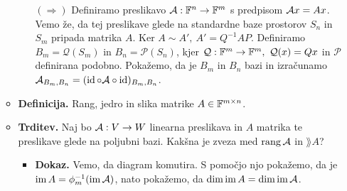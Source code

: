 \begin{enumerate}
\begin{itemize}
\begin{itemize}
            $(\Rightarrow)$ Definiramo preslikavo $\mathcal{A}: \mathbb{F}^n \to \mathbb{F}^m$ s predpisom $\mathcal{A} x = Ax$. Vemo že, da tej preslikave glede na standardne baze prostorov $S_n$ in $S_m$ pripada matrika $A$. Ker $A \sim A', \ A' = Q^{-1} A P$. Definiramo $B_m = \mathcal{Q}(S_m)$ in $B_n = \mathcal{P}(S_n)$, kjer $\mathcal{Q}: \FF^m \to \FF^m, \ \mathcal{Q}(x) = Qx$ in $\mathcal{P}$ definirana podobno. Pokažemo, da je $B_m$ in $B_n$ bazi in izračunamo $\mathcal{A}_{B_m, B_n} = (\operatorname{id} \circ \mathcal{A} \circ \operatorname{id})_{B_m, B_n}$.
        \end{itemize}
        \item \colorbox{purple!30}{\textbf{Definicija.}} Rang, jedro in slika matrike $A \in \mathbb{F}^{m \times n}$. 
        \item \colorbox{blue!30}{\textbf{Trditev.}} Naj bo $\mathcal{A}: V \to W$ linearna preslikava in $A$ matrika te preslikave glede na poljubni bazi. Kakšna je zveza med $\operatorname{rang} \mathcal{A}$ in $\rang A$?
        \begin{itemize}
            \item \colorbox{green!30}{\textbf{Dokaz.}} Vemo, da diagram     
              komutira. S pomočjo njo pokažemo, da je $\operatorname{im} A = \phi^{-1}_m(\operatorname{im} \mathcal{A})$, nato pokažemo, da $\dim \operatorname{im} A = \dim \operatorname{im} \mathcal{A}$.
        \end{itemize}
        

\end{itemize}
\end{enumerate}
